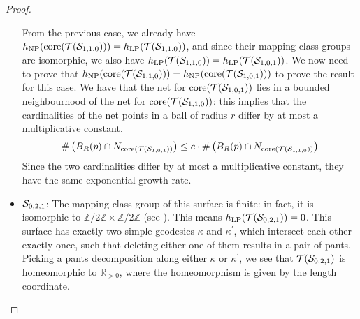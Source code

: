 \documentclass[12pt, reqno]{amsart}
\begin{document}
\begin{proof}
\begin{itemize}
    From the previous case, we already have $h_{\mathrm{NP}}(\mathrm{core}(\mathcal{T}(\mathcal{S}_{1,1,0}))) = h_{\mathrm{LP}}(\mathcal{T}(\mathcal{S}_{1,1,0}))$, and since their mapping class groups are isomorphic, we also have $h_{\mathrm{LP}}(\mathcal{T}(\mathcal{S}_{1,1,0})) = h_{\mathrm{LP}}(\mathcal{T}(\mathcal{S}_{1,0,1}))$.
    We now need to prove that $h_{\mathrm{NP}}(\mathrm{core}(\mathcal{T}(\mathcal{S}_{1,1,0}))) = h_{\mathrm{NP}}(\mathrm{core}(\mathcal{T}(\mathcal{S}_{1,0,1})))$ to prove the result for this case.
    We have that the net for $\mathrm{core}(\mathcal{T}(\mathcal{S}_{1,0,1}))$ lies in a bounded neighbourhood of the net for $\mathrm{core}(\mathcal{T}(\mathcal{S}_{1,1,0}))$: this implies that the cardinalities of the net points in a ball of radius $r$ differ by at most a multiplicative constant.
    \begin{align*}
      \#\left( B_R(p) \cap N_{\mathrm{core}(\mathcal{T}(\mathcal{S}_{1,0,1}))} \right) \leq c \cdot \#\left( B_R(p) \cap N_{\mathrm{core}(\mathcal{T}(\mathcal{S}_{1,1,0}))} \right)
    \end{align*}
    Since the two cardinalities differ by at most a multiplicative constant, they have the same exponential growth rate.
  \item $\mathcal{S}_{0,2,1}$: The mapping class group of this surface is finite: in fact, it is isomorphic to $\mathbb{Z}/2\mathbb{Z} \times \mathbb{Z}/2\mathbb{Z}$ (see \textcite{gendulphe2017whats}).
    This means $h_{\mathrm{LP}}(\mathcal{T}(\mathcal{S}_{0,2,1})) = 0$.
    This surface has exactly two simple geodesics $\kappa$ and $\kappa^{\prime}$, which intersect each other exactly once, such that deleting either one of them results in a pair of pants.
    Picking a pants decomposition along either $\kappa$ or $\kappa^{\prime}$, we see that $\mathcal{T}(\mathcal{S}_{0,2,1})$ is homeomorphic to $\mathbb{R}_{>0}$, where the homeomorphism is given by the length coordinate.


\end{itemize}
\end{proof}
\end{document}
